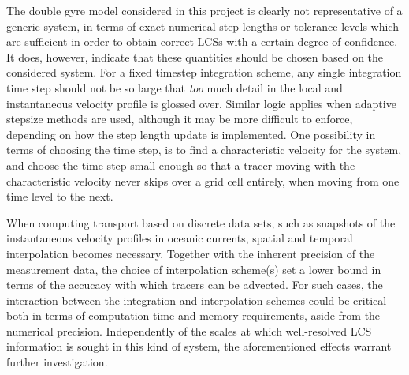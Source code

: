 The double gyre model considered in this project is clearly not representative
of a generic system, in terms of exact numerical step lengths or tolerance
levels which are sufficient in order to obtain correct LCSs with a certain
degree of confidence. It does, however, indicate that these quantities should
be chosen based on the considered system. For a fixed timestep integration
scheme, any single integration time step should not be so large that \emph{too}
much detail in the local and instantaneous velocity profile is glossed over.
Similar logic applies when adaptive stepsize methods are used, although it
may be more difficult to enforce, depending on how the step length
update is implemented. One possibility in terms of choosing the time step, is to
find a characteristic velocity for the system, and choose the time step small
enough so that a tracer moving with the characteristic velocity never skips over
a grid cell entirely, when moving from one time level to the next.

When computing transport based on discrete data sets, such as snapshots of the
instantaneous velocity profiles in oceanic currents, spatial and temporal
interpolation becomes necessary. Together with the inherent precision of the
measurement data, the choice of interpolation scheme(s) set a lower bound
in terms of the accucacy with which tracers can be advected. For such cases,
the interaction between the integration and interpolation schemes could
be critical --- both in terms of computation time and memory requirements,
aside from the numerical precision. Independently of the scales at which
well-resolved LCS information is sought in this kind of system, the
aforementioned effects warrant further investigation.
